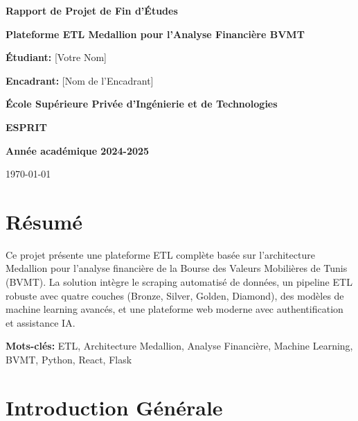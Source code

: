 \documentclass[12pt,a4paper]{article}
\begin{document}
\begin{titlepage}
    \centering
    \vspace*{2cm}
    
    {\Huge\bfseries Rapport de Projet de Fin d'Études\par}
    \vspace{1cm}
    
    {\Large\bfseries Plateforme ETL Medallion pour l'Analyse Financière BVMT\par}
    \vspace{2cm}
    
    {\large\textbf{Étudiant:} [Votre Nom]\par}
    {\large\textbf{Encadrant:} [Nom de l'Encadrant]\par}
    \vspace{1cm}
    
    {\large\textbf{École Supérieure Privée d'Ingénierie et de Technologies}\par}
    {\large\textbf{ESPRIT}\par}
    \vspace{1cm}
    
    {\large\textbf{Année académique 2024-2025}\par}
    
    \vfill
    
    {\large \today\par}
\end{titlepage}

\tableofcontents
\newpage

\section*{Résumé}
Ce projet présente une plateforme ETL complète basée sur l'architecture Medallion pour l'analyse financière de la Bourse des Valeurs Mobilières de Tunis (BVMT). La solution intègre le scraping automatisé de données, un pipeline ETL robuste avec quatre couches (Bronze, Silver, Golden, Diamond), des modèles de machine learning avancés, et une plateforme web moderne avec authentification et assistance IA.

\textbf{Mots-clés:} ETL, Architecture Medallion, Analyse Financière, Machine Learning, BVMT, Python, React, Flask

\newpage

\section{Introduction Générale}
\end{document}
